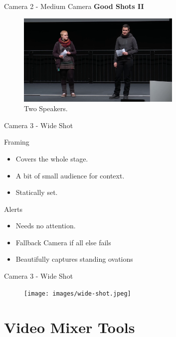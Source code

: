 \documentclass[aspectratio=169]{beamer}
\begin{document}
\begin{frame}{Camera 2 - Medium Camera}
	\textbf{Good Shots II}
	\begin{figure} 
		\centering
		\includegraphics[width=0.7\textwidth]{images/Speaker_full.png}
		\caption{Two Speakers.}
	\end{figure}
\end{frame}

\begin{frame}{Camera 3 - Wide Shot}
		\begin{block}{Framing}
			\begin{itemize}
				\item Covers the whole stage.
				\item A bit of small audience for context.
				\item Statically set.
			\end{itemize}
		\end{block}

		\begin{alertblock}{Alerts}
			\begin{itemize}
				\item Needs no attention. 
				\item Fallback Camera if all else fails 
				\item Beautifully captures standing ovations
			\end{itemize}
		\end{alertblock}
\end{frame}

\begin{frame}{Camera 3 - Wide Shot}
	\begin{figure} 
		\centering
		\texttt{[image: images/wide-shot.jpeg]}
	\end{figure}
\end{frame}


\section{Video Mixer Tools}
\end{document}
